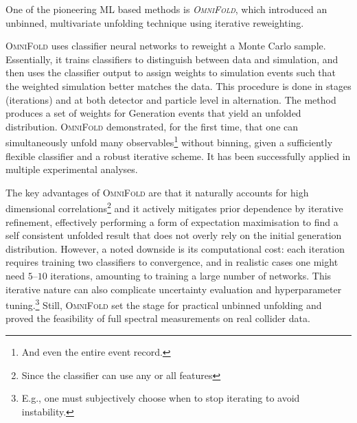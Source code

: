 {        One of the pioneering ML based methods is \emph{\textsc{OmniFold}}, which introduced an unbinned, multivariate unfolding technique using iterative reweighting.
        {\textsc{OmniFold} uses classifier neural networks to reweight a Monte Carlo sample.
        Essentially, it trains classifiers to distinguish between data and simulation, and then uses the classifier output to assign weights to simulation events such that the weighted simulation better matches the data.
        This procedure is done in stages (iterations) and at both detector and particle level in alternation.
        The method produces a set of weights for Generation events that yield an unfolded distribution.
        \textsc{OmniFold} demonstrated, for the first time, that one can simultaneously unfold many observables\footnote{And even the entire event record.} without binning, given a sufficiently flexible classifier and a robust iterative scheme.
        It has been successfully applied in multiple experimental analyses.
        
        The key advantages of \textsc{OmniFold} are that it naturally accounts for high dimensional correlations\footnote{Since the classifier can use any or all features} and it actively mitigates prior dependence by iterative refinement, effectively performing a form of expectation maximisation to find a self consistent unfolded result that does not overly rely on the initial generation distribution.
        However, a noted downside is its computational cost: each iteration requires training two classifiers to convergence, and in realistic cases one might need $\numrange{5}{10}$ iterations, amounting to training a large number of networks.
        This iterative nature can also complicate uncertainty evaluation and hyperparameter tuning.\footnote{E.g., one must subjectively choose when to stop iterating to avoid instability.}
        Still, \textsc{OmniFold} set the stage for practical unbinned unfolding and proved the feasibility of full spectral measurements on real collider data.

}}
